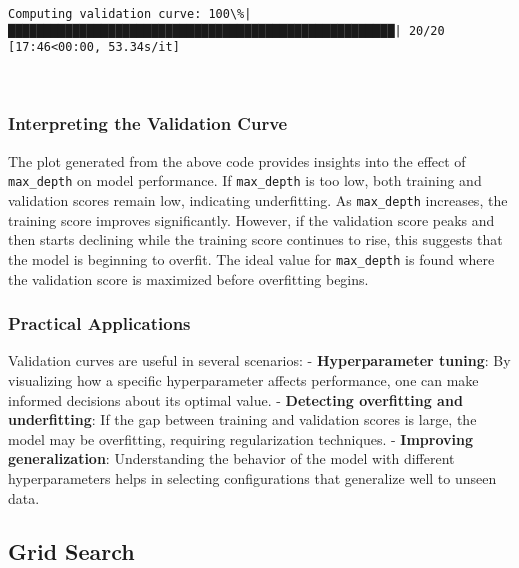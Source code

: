 \documentclass{article}
\begin{document}
    \begin{Verbatim}[commandchars=\\\{\}]
Computing validation curve: 100\%|██████████████████████████████████████████████████████| 20/20 [17:46<00:00, 53.34s/it]

    \end{Verbatim}

    \begin{center}
    \end{center}
    { \hspace*{\fill} \\}
    
    \subsubsection{Interpreting the Validation
Curve}\label{interpreting-the-validation-curve}

The plot generated from the above code provides insights into the effect
of \texttt{max\_depth} on model performance. If \texttt{max\_depth} is
too low, both training and validation scores remain low, indicating
underfitting. As \texttt{max\_depth} increases, the training score
improves significantly. However, if the validation score peaks and then
starts declining while the training score continues to rise, this
suggests that the model is beginning to overfit. The ideal value for
\texttt{max\_depth} is found where the validation score is maximized
before overfitting begins.

\subsubsection{Practical Applications}\label{practical-applications}

Validation curves are useful in several scenarios: -
\textbf{Hyperparameter tuning}: By visualizing how a specific
hyperparameter affects performance, one can make informed decisions
about its optimal value. - \textbf{Detecting overfitting and
underfitting}: If the gap between training and validation scores is
large, the model may be overfitting, requiring regularization
techniques. - \textbf{Improving generalization}: Understanding the
behavior of the model with different hyperparameters helps in selecting
configurations that generalize well to unseen data.

    \subsection{Grid Search}\label{grid-search}
\end{document}
